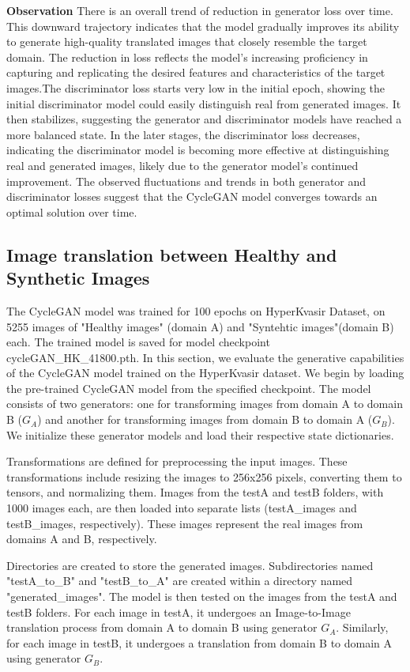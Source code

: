 \documentclass[UKenglish,12pt]{master-style}
\begin{document}
\textbf{Observation}
There is an overall trend of reduction in generator loss over time. This downward trajectory indicates that the model gradually improves its ability to generate high-quality translated images that closely resemble the target domain. The reduction in loss reflects the model's increasing proficiency in capturing and replicating the desired features and characteristics of the target images.The discriminator loss starts very low in the initial epoch, showing the initial discriminator model could easily distinguish real from generated images. It then stabilizes, suggesting the generator and discriminator models have reached a more balanced state.
In the later stages, the discriminator loss decreases, indicating the discriminator model is becoming more effective at distinguishing real and generated images, likely due to the generator model's continued improvement. The observed fluctuations and trends in both generator and discriminator losses suggest that the CycleGAN model converges towards an optimal solution over time.

\subsection{Image translation between Healthy and Synthetic Images}

The CycleGAN model was trained for 100 epochs on HyperKvasir Dataset, on 5255 images of "Healthy images" (domain A) and "Syntehtic images"(domain B) each. The trained model is saved for model checkpoint cycleGAN\_HK\_41800.pth. In this section, we evaluate the generative capabilities of the CycleGAN model trained on the HyperKvasir dataset. We begin by loading the pre-trained CycleGAN model from the specified checkpoint. The model consists of two generators: one for transforming images from domain A to domain B ($G_A$) and another for transforming images from domain B to domain A ($G_B$). We initialize these generator models and load their respective state dictionaries.

Transformations are defined for preprocessing the input images. These transformations include resizing the images to 256x256 pixels, converting them to tensors, and normalizing them. Images from the testA and testB folders, with 1000 images each, are then loaded into separate lists (testA\_images and testB\_images, respectively). These images represent the real images from domains A and B, respectively.

Directories are created to store the generated images. Subdirectories named "testA\_to\_B" and "testB\_to\_A" are created within a directory named "generated\_images". The model is then tested on the images from the testA and testB folders. For each image in testA, it undergoes an Image-to-Image translation process from domain A to domain B using generator $G_A$. Similarly, for each image in testB, it undergoes a translation from domain B to domain A using generator $G_B$.
\end{document}
